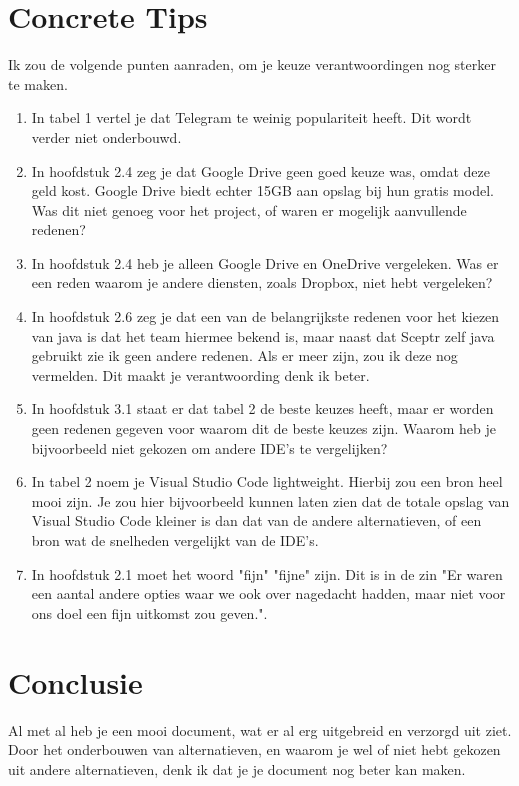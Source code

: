 \documentclass[a4paper]{report}
\begin{document}
\section{Concrete Tips}
\label{tips}
Ik zou de volgende punten aanraden, om je keuze verantwoordingen nog sterker te maken.
\begin{enumerate}
  \item In tabel 1 vertel je dat Telegram te weinig populariteit heeft. Dit wordt verder niet onderbouwd. 
  \item In hoofdstuk 2.4 zeg je dat Google Drive geen goed keuze was, omdat deze geld kost. Google Drive biedt echter 15GB aan opslag bij hun gratis model\cite{gdrivePricing}. Was dit niet genoeg voor het project, of waren er mogelijk aanvullende redenen? 
  \item In hoofdstuk 2.4 heb je alleen Google Drive en OneDrive vergeleken. Was er een reden waarom je andere diensten, zoals Dropbox, niet hebt vergeleken? 
  \item In hoofdstuk 2.6 zeg je dat een van de belangrijkste redenen voor het kiezen van java is dat het team hiermee bekend is, maar naast dat Sceptr zelf java gebruikt zie ik geen andere redenen. Als er meer zijn, zou ik deze nog vermelden. Dit maakt je verantwoording denk ik beter.
  \item In hoofdstuk 3.1 staat er dat tabel 2 de beste keuzes heeft, maar er worden geen redenen gegeven voor waarom dit de beste keuzes zijn. Waarom heb je bijvoorbeeld niet gekozen om andere IDE's te vergelijken?
  \item In tabel 2 noem je Visual Studio Code lightweight. Hierbij zou een bron heel mooi zijn. Je zou hier bijvoorbeeld kunnen laten zien dat de totale opslag van Visual Studio Code kleiner is dan dat van de andere alternatieven, of een bron wat de snelheden vergelijkt van de IDE's.
  \item In hoofdstuk 2.1 moet het woord "fijn" "fijne" zijn. Dit is in de zin "Er waren een aantal andere opties waar we ook over nagedacht hadden, maar niet voor ons doel een fijn uitkomst zou geven.".
\end{enumerate}

\section{Conclusie}
Al met al heb je een mooi document, wat er al erg uitgebreid en verzorgd uit ziet. 
Door het onderbouwen van alternatieven, en waarom je wel of niet hebt gekozen uit andere alternatieven, denk ik dat je je document nog beter kan maken. 
\end{document}
